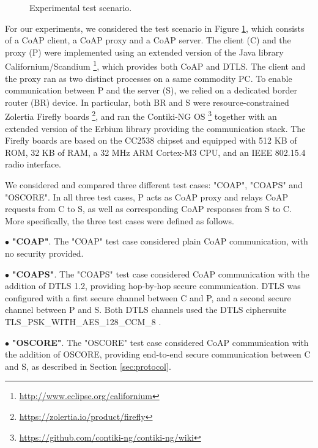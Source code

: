 {\begin{figure}[!htbp]
\caption[Test set-up]{Experimental test scenario.}
\label{fig:setup}
\end{figure}

For our experiments, we considered the test scenario in Figure \ref{fig:setup}, which consists of a CoAP client, a CoAP proxy and a CoAP server. The client (C) and the proxy (P) were implemented using an extended version of the Java library Californium/Scandium \footnote{\url{http://www.eclipse.org/californium}}, which provides both CoAP and DTLS. The client and the proxy ran as two distinct processes on a same commodity PC. To enable communication between P and the server (S), we relied on a dedicated border router (BR) device. In particular, both BR and S were resource-constrained Zolertia Firefly boards \footnote{\url{https://zolertia.io/product/firefly}}, and ran the Contiki-NG OS \footnote{\url{https://github.com/contiki-ng/contiki-ng/wiki}} together with an extended version of the Erbium library providing the communication stack. The Firefly boards are based on the CC2538 chipset and equipped with 512 KB of ROM, 32 KB of RAM, a 32 MHz ARM Cortex-M3 CPU, and an IEEE 802.15.4 \cite{IEEEStd802.15.4} radio interface.

We considered and compared three different test cases: "COAP", "COAPS" and "OSCORE". In all three test cases, P acts as CoAP proxy and relays CoAP requests from C to S, as well as corresponding CoAP responses from S to C. More specifically, the three test cases were defined as follows.

\noindent
$\bullet$ \textbf{"COAP"}. The "COAP" test case considered plain CoAP communication, with no security provided.

\noindent
$\bullet$ \textbf{"COAPS"}. The "COAPS" test case considered CoAP communication with the addition of DTLS 1.2, providing hop-by-hop secure communication. DTLS was configured with a first secure channel between C and P, and a second secure channel between P and S. Both DTLS channels used the DTLS ciphersuite TLS\_PSK\_WITH\_AES\_128\_CCM\_8 \cite{rfc6655}.

\noindent
$\bullet$ \textbf{"OSCORE"}. The "OSCORE" test case considered CoAP communication with the addition of OSCORE, providing end-to-end secure communication between C and S, as described in Section \ref{sec:protocol}.

}
